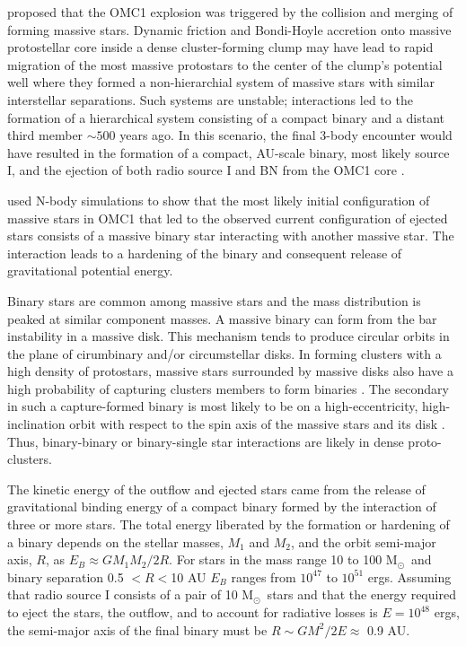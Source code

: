 \documentclass[twocolumn,times]{aastex6}
\newcommand{\Msol}{M$_{\odot}$}
\begin{document}
\citet{BallyZinnecker2005} proposed that the OMC1 explosion was triggered 
by the collision and merging of forming massive stars.  
Dynamic friction and Bondi-Hoyle accretion onto massive protostellar core inside 
a dense cluster-forming clump may have lead to rapid  migration of the most 
massive protostars to the center of the clump's potential well where they formed a
non-hierarchial system of massive stars with similar interstellar separations.    
Such systems are unstable;  interactions led to the formation of  a 
hierarchical system  consisting of a  compact binary and a distant  third member
$\sim500$ years ago.  
In this scenario,  the final 3-body encounter would have resulted in the 
formation  of a compact, AU-scale binary,   most likely source I, and the ejection 
of both radio source I and BN from the OMC1 core \citet{Bally2011} . 

\citealt{Goddi2011} used N-body simulations to show  that the most likely initial configuration
of massive stars in OMC1 that led to the observed current configuration of ejected stars
consists of a massive binary star interacting with another massive star.  
The interaction leads to a hardening of the binary and consequent release of gravitational 
potential energy. 

Binary stars are common among massive stars and the mass distribution is peaked 
at similar component masses.  A massive binary can form from the bar instability in a 
massive disk.   This mechanism tends to produce circular orbits in the plane of 
cirumbinary and/or  circumstellar  disks.    In forming clusters with a high density of 
protostars,  massive stars surrounded by massive disks also have a high probability 
of capturing clusters members to form binaries 
\citep{MoeckelBally2006, MoeckelBally2007a}.   The secondary in such a 
capture-formed binary is most likely to be on a high-eccentricity, high-inclination orbit  
with respect to the spin axis of the massive stars and its disk  
\citep{MoeckelBally2007b, Cunningham2009}.     Thus, binary-binary or binary-single star
interactions are likely in dense proto-clusters. 

The kinetic energy of the outflow and ejected  stars came from the release 
of gravitational binding energy of a compact binary  formed  by the  
interaction of  three or more stars.  The total  energy liberated by the formation or
hardening of a binary depends on the stellar masses, $M_1$ and $M_2$,  and the
orbit semi-major axis, $R$, as $E_B \approx G M_1 M_2 / 2 R$.
For stars in the mass range 10 to 100 \Msol\ and binary separation 0.5 $<R<$10 AU
$E_B$ ranges from  $10^{47}$ to $ 10^{51}$ ergs. 
Assuming that radio source I consists of a pair of 10 \Msol\ stars and that the energy 
required to eject the stars, the outflow, and to account for radiative losses is 
$E = 10^{48}$ ergs,   the semi-major axis of the final binary must be
$R \sim GM^2 / 2 E \approx$ 0.9 AU. 
\end{document}
